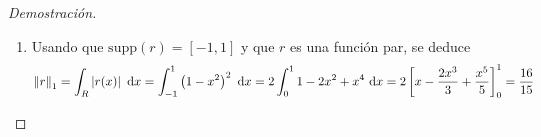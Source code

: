 \documentclass[10pt,a4paper]{report}
\newcommand{\abs}[2][y]{\if#1y\left\fi\lvert#2\if#1y\right\fi\rvert}
\newcommand{\norm}[2][y]{{\if#1y\left\fi\lVert#2\if#1y\right\fi\rVert}}
\theoremstyle{definition}
\renewcommand{\theproblem}{\Alph{problem}}
\numberwithin{equation}{problem}
\providecommand{\abs}[1]{\left\lvert#1\right\rvert}
\providecommand{\norm}[1]{\left\lVert#1\right\rVert}
\begin{document}
\begin{proof}[\textcolor{rojo}{Demostración}]
\begin{enumerate}[label=\textbf{\theproblem.\arabic{*}.},ref=\theproblem.\arabic{*},parsep=1ex]
              Por otro lado
              \begin{itemize}
              	\item Cuando $\abs{x}<1$
              	\begin{align*}
              		r''(x) = 4\left(3x^{2}-1\right).
              	\end{align*}
                \item Cuando $\abs{x}>1$
                \begin{align*}
                	r''(x) = 0.
                \end{align*}
                \item Cuando $x=1$
                \begin{align*}
                	r''(1) = \lim_{x\to 1}\frac{r'(x)-r'(1)}{x-1} = \lim_{x\to 1}\frac{-4x(1-x^{2})}{x-1} = \lim_{x\to 1}\frac{-4x(1-x)(1+x)}{x-1} = \lim_{x\to 1} 4x(1+x) = 8.
                \end{align*}
                \item Cuando $x=-1$
                \begin{align*}
                	r''(-1) = \lim_{x\to-1}\frac{r'(x)-r'(-1)}{x+1} = \lim_{x\to -1} \frac{-4x(1-x^{2})}{x+1} = \lim_{x\to -1}\frac{-4x(1-x)(1+x)}{x+1} = \lim_{x\to -1}-4x(1-x) = 8.
                \end{align*}
              \end{itemize}
              Luego, la función $r''$ tiene la forma
              \begin{align*}
              	r''(x) := \begin{cases}
              		4\left(3x^{2}-1\right) & \text{si } \abs{x}<1,\\
              		8 & \text{si } \abs{x} = 1,\\
              		0 & \text{si } \abs{x} > 1.
              	\end{cases}
              \end{align*}
              Esta función no es continua cuando $x = 1$, en efecto,
              \begin{align*}
              	\lim_{x\to 1^{+}}r''(x) = 0 \neq r''(1) .
              \end{align*}
              Con lo anterior se deduce que $r\notin C^{2}_{c}(R)$.
              \item Usando que $\text{supp}(r) = [-1,1]$ y que $r$ es una función par, se deduce
              \begin{align*}
              	\norm{r}_{1} = \int_{R}\abs{r(x)}\ \text{d}x = \int_{-1}^{1} \left(1-x^{2}\right)^{2}\ \text{d}x = 2\int_{0}^{1}1-2x^{2}+x^{4}\ \text{d}x = 2\left[x-\frac{2x^{3}}{3} + \frac{x^{5}}{5}\right]_{0}^{1} = \frac{16}{15}

\end{align*}
\end{enumerate}
\end{proof}
\end{document}
